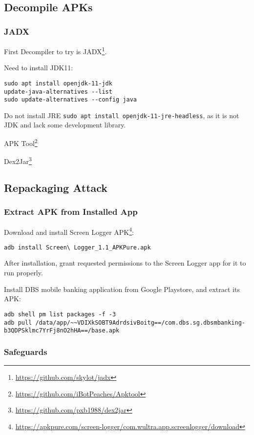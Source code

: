 \label{task:20240610_android}

\subsection{Decompile APKs}

\subsubsection{JADX}
First Decompiler to try is JADX\footnote{\url{https://github.com/skylot/jadx}}.

Need to install JDK11:
\begin{lstlisting}
sudo apt install openjdk-11-jdk
update-java-alternatives --list
sudo update-alternatives --config java
\end{lstlisting}

Do not install JRE \texttt{sudo apt install openjdk-11-jre-headless}, as it is not JDK and lack some development library.

APK Tool\footnote{\url{https://github.com/iBotPeaches/Apktool}}

Dex2Jar\footnote{\url{https://github.com/pxb1988/dex2jar}}

\subsection{Repackaging Attack}

\subsubsection{Extract APK from Installed App}

Download and install Screen Logger APK\footnote{\url{https://apkpure.com/screen-logger/com.wultra.app.screenlogger/download}}:
\begin{lstlisting}
adb install Screen\ Logger_1.1_APKPure.apk 
\end{lstlisting}
After installation, grant requested permissions to the Screen Logger app for it to run properly.

Install DBS mobile banking application from Google Playstore, and extract its APK:
\begin{lstlisting}
adb shell pm list packages -f -3
adb pull /data/app/~~VDIXkSOBT9AdrdsivBoitg==/com.dbs.sg.dbsmbanking-b3QDPSklmc7YrFj8nO2hHA==/base.apk
\end{lstlisting}

\subsubsection{Safeguards}

